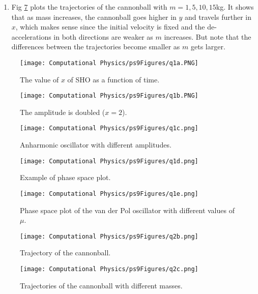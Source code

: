 \documentclass[11pt]{article}
\begin{document}
\begin{enumerate}[label=\alph*)]
    \item Fig \ref{fig:Q2c} plots the trajectories of the cannonball with $m=1, 5, 10, 15$kg. It shows that as mass increases, the cannonball goes higher in $y$ and travels further in $x$, which makes sense since the initial velocity is fixed and the de-accelerations in both directions are weaker as $m$ increases. But note that the differences between the trajectories become smaller as $m$ gets larger.
\end{enumerate}

\begin{figure}[b!]
\centering
\texttt{[image: Computational Physics/ps9Figures/q1a.PNG]}
\caption{The value of $x$ of SHO as a function of time.}
  \label{fig:Q1a}
\end{figure}

\begin{figure}[b!]
\centering
\texttt{[image: Computational Physics/ps9Figures/q1b.PNG]}
\caption{The amplitude is doubled ($x=2$).}
  \label{fig:Q1b}
\end{figure}

\begin{figure}[b!]
\centering
\texttt{[image: Computational Physics/ps9Figures/q1c.png]}
\caption{Anharmonic oscillator with different amplitudes.}
  \label{fig:Q1c}
\end{figure}

\begin{figure}[b!]
\centering
\texttt{[image: Computational Physics/ps9Figures/q1d.png]}
\caption{Example of phase space plot.}
  \label{fig:Q1d}
\end{figure}

\begin{figure}[b!]
\centering
\texttt{[image: Computational Physics/ps9Figures/q1e.png]}
\caption{Phase space plot of the van der Pol oscillator with different values of $\mu$.}
  \label{fig:Q1e}
\end{figure}

\begin{figure}[b!]
\centering
\texttt{[image: Computational Physics/ps9Figures/q2b.png]}
\caption{Trajectory of the cannonball.}
  \label{fig:Q2b}
\end{figure}

\begin{figure}[b!]
\centering
\texttt{[image: Computational Physics/ps9Figures/q2c.png]}
\caption{Trajectories of the cannonball with different masses.}
  \label{fig:Q2c}
\end{figure}





\end{document}
